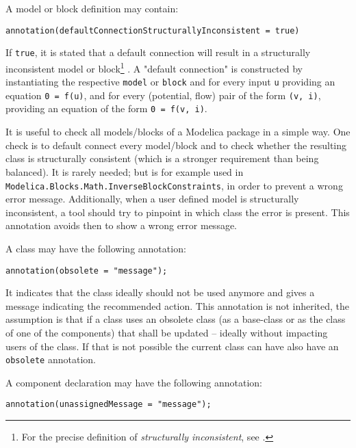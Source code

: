 A model or block definition may contain:
\begin{lstlisting}[language=modelica]
annotation(defaultConnectionStructurallyInconsistent = true)
\end{lstlisting}%

If \lstinline!true!, it is stated that a default connection will result in a structurally inconsistent model or block\footnote{%
  For the precise definition of \emph{structurally inconsistent}, see \textcite{Pantelides1988ConsistentInitialization}.}%
.
A "default connection" is constructed by instantiating the respective \lstinline!model! or \lstinline!block! and for every input \lstinline!u! providing an equation \lstinline!0 = f(u)!, and for every (potential, flow) pair of the form \lstinline!(v, i)!, providing an equation of the form \lstinline!0 = f(v, i)!.

\begin{nonnormative}
It is useful to check all models/blocks of a Modelica package in a simple way.  One check is to default connect every model/block and to check whether the resulting class is structurally consistent (which is a stronger requirement than being balanced).  It is rarely needed; but is for example used in \lstinline!Modelica.Blocks.Math.InverseBlockConstraints!, in order to prevent a wrong error message.  Additionally, when a user defined model is structurally inconsistent, a tool should try to pinpoint in which class the error is present.  This annotation avoids then to show a wrong error message.
\end{nonnormative}

A class may have the following annotation:
\begin{lstlisting}[language=modelica]
annotation(obsolete = "message");
\end{lstlisting}%

It indicates that the class ideally should not be used anymore and gives a message indicating the recommended action.  This annotation is not inherited, the assumption is that if a class uses an obsolete class (as a base-class or as the class of one of the components) that shall be updated -- ideally without impacting users of the class.  If that is not possible the current class can have also have an \lstinline!obsolete! annotation.

A component declaration may have the following annotation:
\begin{lstlisting}[language=modelica]
annotation(unassignedMessage = "message");
\end{lstlisting}%

